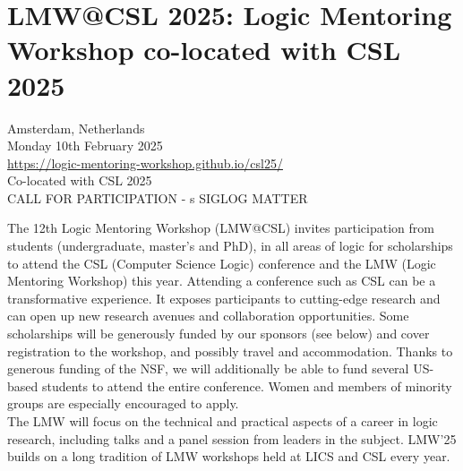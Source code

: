 \documentclass[prodmode,acmtecs]{acmsmall} %
\begin{document}
\section{LMW@CSL 2025: Logic Mentoring Workshop co-located with CSL 2025}\label{LMWCSL2025}  Amsterdam, Netherlands\\ 
  Monday 10th February 2025\\ 
  \href{https://logic-mentoring-workshop.github.io/csl25/}{https://logic-mentoring-workshop.github.io/csl25/}\\ 
  Co-located with CSL 2025\\ 
CALL FOR PARTICIPATION - s SIGLOG MATTER 

  The 12th Logic Mentoring Workshop (LMW@CSL) invites participation from students (undergraduate, master's and PhD), in all areas of logic for scholarships to attend the CSL (Computer Science Logic) conference and the LMW (Logic Mentoring Workshop) this year. Attending a conference such as CSL can be a transformative experience. It exposes participants to cutting-edge research and can open up new research avenues and collaboration opportunities. Some scholarships will be generously funded by our sponsors (see below) and cover registration to the workshop, and possibly travel and accommodation. Thanks to generous funding of the NSF, we will additionally be able to fund several US-based students to attend the entire conference. Women and members of minority groups are especially encouraged to apply.\\ 
  The LMW will focus on the technical and practical aspects of a career in logic research, including talks and a panel session from leaders in the subject. LMW'25 builds on a long tradition of LMW workshops held at LICS and CSL every year.\\ 
\end{document}
